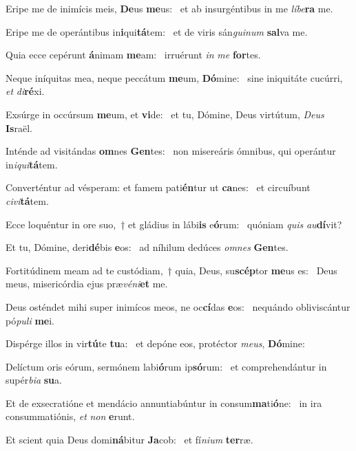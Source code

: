 \item Eripe me de inimícis meis, \textbf{De}us \textbf{me}us:~\psstar{} et ab insurgéntibus in me \textit{líbe}\textbf{ra} me.
\item Eripe me de operántibus in\textbf{i}qui\textbf{tá}tem:~\psstar{} et de viris sán\textit{guinum} \textbf{sal}va me.
\item Quia ecce cepérunt \textbf{á}nimam \textbf{me}am:~\psstar{} irruérunt \textit{in} \textit{me} \textbf{for}tes.
\item Neque iníquitas mea, neque peccátum \textbf{me}um, \textbf{Dó}mine:~\psstar{} sine iniquitáte cucúrri, \textit{et} \textit{di}\textbf{ré}xi.
\item Exsúrge in occúrsum \textbf{me}um, et \textbf{vi}de:~\psstar{} et tu, Dómine, Deus virtútum, \textit{Deus} \textbf{Is}raël.
\item Inténde ad visitándas \textbf{om}nes \textbf{Gen}tes:~\psstar{} non misereáris ómnibus, qui operántur in\textit{iqui}\textbf{tá}tem.
\item Converténtur ad vésperam: et famem pati\textbf{én}tur ut \textbf{ca}nes:~\psstar{} et circuíbunt \textit{civi}\textbf{tá}tem.
\item Ecce loquéntur in ore suo,~† et gládius in lábi\textbf{is} e\textbf{ó}rum:~\psstar{} quóniam \textit{quis} \textit{au}\textbf{dí}vit?
\item Et tu, Dómine, deri\textbf{dé}bis \textbf{e}os:~\psstar{} ad níhilum dedúces \textit{omnes} \textbf{Gen}tes.
\item Fortitúdinem meam ad te custódiam,~† quia, Deus, su\textbf{scép}tor \textbf{me}us es:~\psstar{} Deus meus, misericórdia ejus præ\textit{véni}\textbf{et} me.
\item Deus osténdet mihi super inimícos meos, ne oc\textbf{cí}das \textbf{e}os:~\psstar{} nequándo obliviscántur pó\textit{puli} \textbf{me}i.
\item Dispérge illos in vir\textbf{tú}te \textbf{tu}a:~\psstar{} et depóne eos, protéctor \textit{meus}, \textbf{Dó}mine:
\item Delíctum oris eórum, sermónem labi\textbf{ó}rum ip\textbf{só}rum:~\psstar{} et comprehendántur in supér\textit{bia} \textbf{su}a.
\item Et de exsecratióne et mendácio annuntiabúntur in consum\textbf{ma}ti\textbf{ó}ne:~\psstar{} in ira consummatiónis, \textit{et} \textit{non} \textbf{e}runt.
\item Et scient quia Deus domi\textbf{ná}bitur \textbf{Ja}cob:~\psstar{} et fí\textit{nium} \textbf{ter}ræ.
